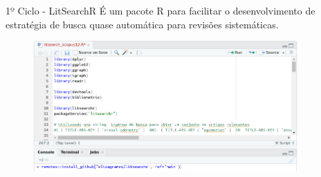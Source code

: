 \begin{frame}{1º Ciclo - LitSearchR}
	É um pacote R para facilitar o desenvolvimento de estratégia de busca quase automática para revisões sistemáticas.
	\begin{figure}[hb]
		\includegraphics[width=0.9\textwidth]{figures/litsearchr/l1.png}
	\end{figure}
\end{frame}

